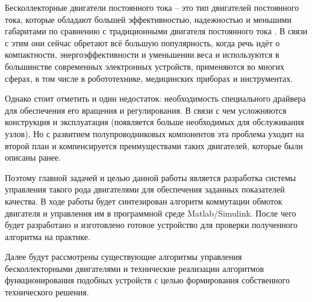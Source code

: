\Introduction
\thispagestyle{empty}

Бесколлекторные двигатели постоянного тока – это тип двигателей постоянного тока, которые обладают большей эффективностью, надежностью и меньшими габаритами по сравнению с традиционными двигателя постоянного тока \cite{book.itmo_motors}. В связи с этим они сейчас обретают всё большую популярность, когда речь идёт о компактности, энергоэффективности и уменьшении веса и используются в большинстве современных электронных устройств, применяются во многих сферах, в том числе в робототехнике, медицинских приборах и инструментах. 

Однако стоит отметить и один недостаток: необходимость специального драйвера для обеспечения его вращения и регулирования. В связи с чем усложняются конструкция и эксплуатация (появляется больше необходимых для обслуживания узлов). Но с развитием полупроводниковых компонентов эта проблема уходит на второй план и компенсируется преимуществами таких двигателей, которые были описаны ранее.

Поэтому главной задачей и целью данной работы является разработка системы управления такого рода двигателями для обеспечения заданных показателей качества. В ходе работы будет синтезирован алгоритм коммутации обмоток двигателя и управления им в программной среде Matlab/Simulink. После чего будет разработано и изготовлено готовое устройство для проверки полученного алгоритма на практике. 

Далее будут рассмотрены существующие алгоритмы управления бесколлекторными двигателями и технические реализации алгоритмов функционирования подобных устройств с целью формирования собственного технического решения.




